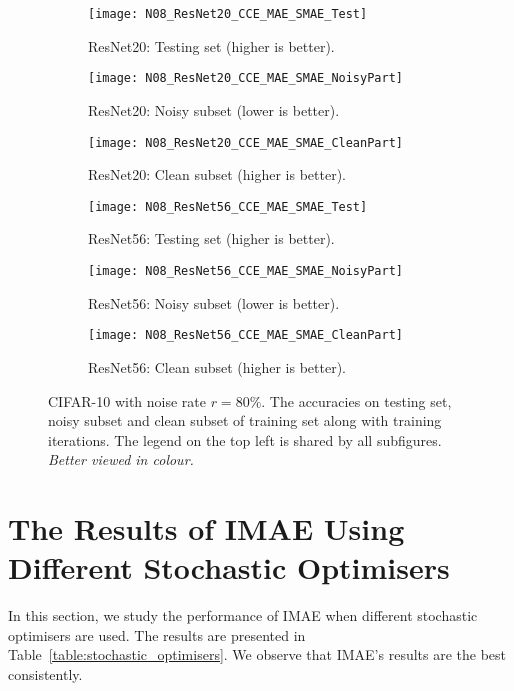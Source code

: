 \documentclass{article}
\begin{document}
\begin{figure*}[t!]
	\centering
	\begin{subfigure}[t!]{0.33\linewidth}
		\centering
		\texttt{[image: N08\_ResNet20\_CCE\_MAE\_SMAE\_Test]}
		\caption{ResNet20: Testing set (higher is better).}
	\end{subfigure}\begin{subfigure}[t!]{0.33\linewidth}
		\centering
		\texttt{[image: N08\_ResNet20\_CCE\_MAE\_SMAE\_NoisyPart]}
		\caption{ResNet20: Noisy subset  (lower is better).}
	\end{subfigure}
	\begin{subfigure}[t!]{0.33\linewidth}
		\centering
		\texttt{[image: N08\_ResNet20\_CCE\_MAE\_SMAE\_CleanPart]}
		\caption{ResNet20: Clean subset (higher is better).}
	\end{subfigure}
\begin{subfigure}[t!]{0.33\linewidth}
		\centering
		\texttt{[image: N08\_ResNet56\_CCE\_MAE\_SMAE\_Test]}
		\caption{ResNet56: Testing set (higher is better).}
	\end{subfigure}\begin{subfigure}[t!]{0.33\linewidth}
		\centering
		\texttt{[image: N08\_ResNet56\_CCE\_MAE\_SMAE\_NoisyPart]}
		\caption{ResNet56: Noisy subset  (lower is better).}
	\end{subfigure}
	\begin{subfigure}[t!]{0.33\linewidth}
		\centering
		\texttt{[image: N08\_ResNet56\_CCE\_MAE\_SMAE\_CleanPart]}
		\caption{ResNet56: Clean subset (higher is better).}
	\end{subfigure}
\caption{CIFAR-10 with noise rate $r=80\%$. The accuracies on testing set, noisy subset and clean subset of training set along with training iterations.
		The legend on the top left is shared by all subfigures. 
		\textit{Better viewed in colour.} }
	\label{fig:ResNet2056_Noise80_CCE_MAE_SMAE_dynamics}
\end{figure*}





\section{The Results of IMAE Using Different Stochastic Optimisers}
In this section, we study the performance of IMAE when different stochastic optimisers are used. The results are presented in Table~\ref{table:stochastic_optimisers}. We observe that IMAE's results are the best consistently. 
\end{document}
